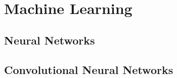 %
%

\part{Machine Learning}\label{part:machine_learning}


\chapter{Neural Networks}\label{ch:machine_learning:neural_networks}


\chapter{Convolutional Neural Networks}\label{ch:machine_learning:convolutional_neural_networks}
